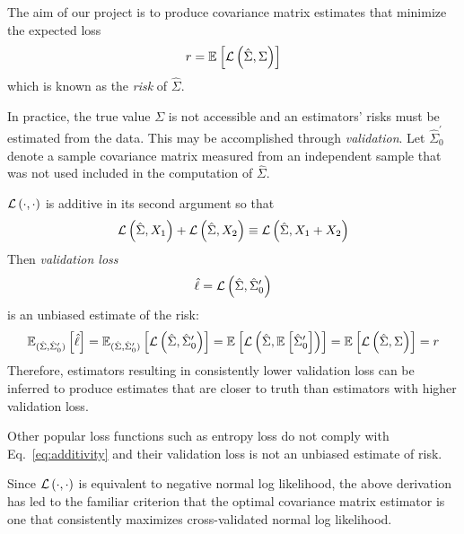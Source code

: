 The aim of our project is to produce covariance matrix estimates that minimize the expected loss 
\begin{equation}
r = \E{\loss{\hat\Sigma, \Sigma}}
\end{equation}
which is known as the \emph{risk} of $\hat\Sigma$.

In practice, the true value $\Sigma$ is not accessible and an estimators' risks must be estimated from the data.  This may be accomplished through \emph{validation}.  
Let $\hat\Sigma_0^\prime$ denote a sample covariance matrix measured from an independent sample that was not used included in the computation of $\hat\Sigma$. 

$\loss{\cdot,\cdot}$ is additive in its second argument so that 
 \begin{equation}\label{eq:additivity}
 \loss{\hat\Sigma,X_1} + \loss{\hat\Sigma,X_2} \equiv \loss{\hat\Sigma,X_1+X_2}
 \end{equation}
Then \emph{validation loss}  
\begin{equation}\label{eq:validationLoss}
\hat \ell = \loss{\hat\Sigma,\hat\Sigma_0^\prime}
\end{equation}
is an unbiased estimate of the risk:
 \begin{equation}\label{eq:empiricalRisk}
\E[(\hat\Sigma, \hat\Sigma_0^\prime)] {\hat\ell} 
= \E[(\hat\Sigma, \hat\Sigma_0^\prime)]{\loss{\hat\Sigma,\hat\Sigma_0^\prime}}
= \E{\loss{\hat\Sigma,\E{\hat\Sigma_0^\prime}}}
= \E{\loss{\hat\Sigma,\Sigma}} = r
 \end{equation}
Therefore, estimators resulting in consistently lower validation loss can be inferred to produce estimates that are closer to truth than estimators with higher validation loss.

Other popular loss functions such as entropy loss do not comply with Eq.~\ref{eq:additivity} and their validation loss is not an unbiased estimate of risk.

Since $\loss{\cdot,\cdot}$ is equivalent to negative normal log likelihood, the above derivation has led to the familiar criterion that the optimal covariance matrix estimator is one that consistently maximizes cross-validated normal log likelihood.


